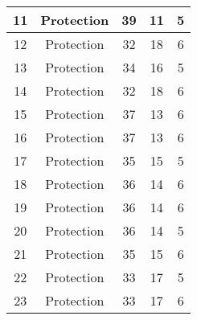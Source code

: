 \documentclass[results.tex]{subfiles}
\begin{document}
\begin{center}
\begin{tabular}{| c || c | c | c | c |}
            \hline
            11                      & Protection                   & 39                     & 11                      & 5                    \\
            \hline
            12                      & Protection                   & 32                     & 18                      & 6                    \\
            \hline
            13                      & Protection                   & 34                     & 16                      & 5                    \\
            \hline
            14                      & Protection                   & 32                     & 18                      & 6                    \\
            \hline
            15                      & Protection                   & 37                     & 13                      & 6                    \\
            \hline
            16                      & Protection                   & 37                     & 13                      & 6                    \\
            \hline
            17                      & Protection                   & 35                     & 15                      & 5                    \\
            \hline
            18                      & Protection                   & 36                     & 14                      & 6                    \\
            \hline
            19                      & Protection                   & 36                     & 14                      & 6                    \\
            \hline
            20                      & Protection                   & 36                     & 14                      & 5                    \\
            \hline
            21                      & Protection                   & 35                     & 15                      & 6                    \\
            \hline
            22                      & Protection                   & 33                     & 17                      & 5                    \\
            \hline
            23                      & Protection                   & 33                     & 17                      & 6                    \\

\end{tabular}
\end{center}
\end{document}
